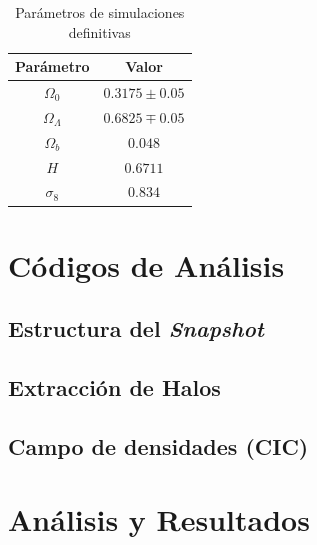 \begin{table}[H]
	\centering
	\begin{tabular}{cc}
		\hline \hline
		\textbf{Parámetro} & \textbf{Valor} 		\\
		\hline
		$\Omega_0$ 			& $0.3175\pm0.05$ 	\\
		$\Omega_\Lambda$ 	& $0.6825 \mp 0.05$	\\
		$\Omega_b$ 			& $0.048$			\\
		$H$					& $0.6711$			\\
		$\sigma_8$			& $0.834$			\\
		\hline
	\end{tabular}
	\caption{Parámetros de simulaciones definitivas}
	\label{tab:param}
\end{table}

\section{Códigos de Análisis}

\subsection{Estructura del \textit{Snapshot}}
\label{sub:snap}

\subsection{Extracción de Halos}



\subsection{Campo de densidades (CIC)}
\label{sub:CIC}

\section{Análisis y Resultados}
